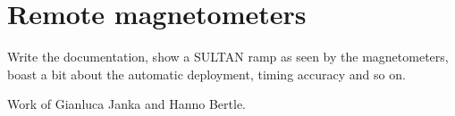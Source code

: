 














\section{Remote magnetometers}
Write the documentation, show a SULTAN ramp as seen by the magnetometers, boast a bit about the automatic deployment, timing accuracy and so on.

Work of Gianluca Janka and Hanno Bertle.
